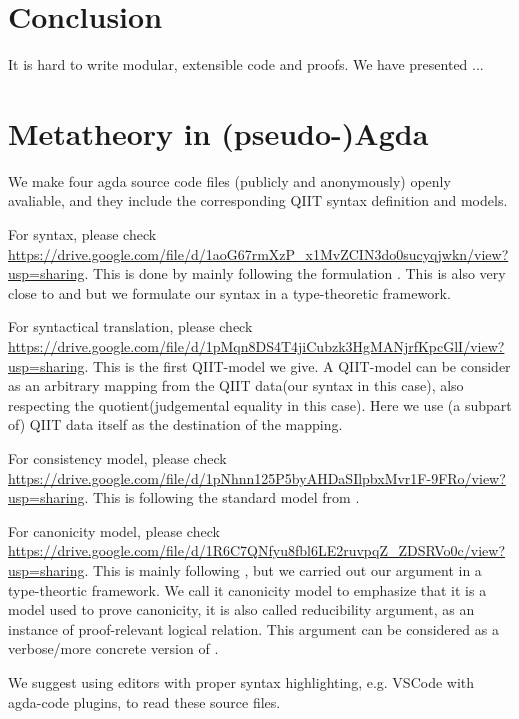 \section{Conclusion}
\label{sec:conclusion}

It is hard to write modular, extensible code and proofs.
We have presented ...

\setlength{\bibsep}{.8ex}



\appendix

\section{Metatheory in (pseudo-)Agda}
We make four agda source code files (publicly and anonymously) openly avaliable, and they include the corresponding QIIT syntax definition and models. 

For syntax, please check \\ \href{https://drive.google.com/file/d/1aoG67rmXzP_x1MvZCIN3do0sucyqjwkn/view?usp=sharing}{https://drive.google.com/file/d/1aoG67rmXzP_x1MvZCIN3do0sucyqjwkn/view?usp=sharing}. This is done by mainly following the formulation \citet{altkap2016}. This is also very close to \citet{coquand2018canonicity} and \citet{sterling2019algebraic} but we formulate our syntax in a type-theoretic framework.

For syntactical translation, please check \\ \href{https://drive.google.com/file/d/1pMqn8DS4T4jiCubzk3HgMANjrfKpcGlI/view?usp=sharing}{https://drive.google.com/file/d/1pMqn8DS4T4jiCubzk3HgMANjrfKpcGlI/view?usp=sharing}. This is the first QIIT-model we give. A QIIT-model can be consider as an arbitrary mapping from the QIIT data(our syntax in this case), also respecting the quotient(judgemental equality in this case). Here we use (a subpart of) QIIT data itself as the destination of the mapping. 

For consistency model, please check \\ \href{https://drive.google.com/file/d/1pNhnn125P5byAHDaSIlpbxMvr1F-9FRo/view?usp=sharing}{https://drive.google.com/file/d/1pNhnn125P5byAHDaSIlpbxMvr1F-9FRo/view?usp=sharing}. This is following the standard model from \citet{altkap2016,kaposi2017type,kaposi2019gluing}.

For canonicity model, please check \\ \href{https://drive.google.com/file/d/1R6C7QNfyu8fbl6LE2ruvpqZ_ZDSRVo0c/view?usp=sharing}{https://drive.google.com/file/d/1R6C7QNfyu8fbl6LE2ruvpqZ_ZDSRVo0c/view?usp=sharing}. This is mainly following \citet{coquand2018canonicity,sterling2019algebraic}, but we carried out our argument in a type-theortic framework.  We call it canonicity model to emphasize that it is a model used to prove canonicity, it is also called reducibility argument, as an instance of proof-relevant logical relation. This argument can be considered as a verbose/more concrete version of \citet{kaposi2019gluing}.

We suggest using editors with proper syntax highlighting, e.g. VSCode with agda-code plugins, to read these source files.